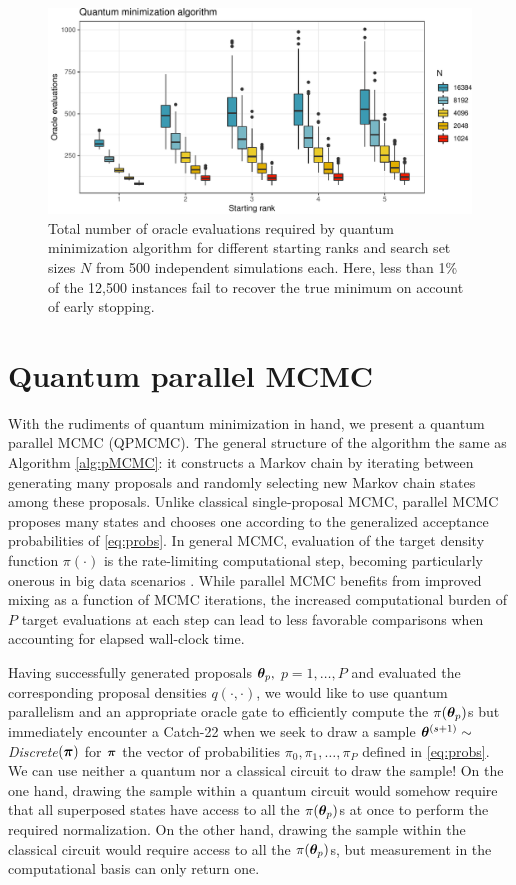 \documentclass[12pt]{article} %
\begin{document}
 \begin{figure}[!t]
	\centering
	\includegraphics[width=0.7\linewidth]{qMinAlg.pdf}
	\caption{Total number of oracle evaluations required by quantum minimization algorithm \citep{durr1996quantum} for different starting ranks and search set sizes $N$ from 500 independent simulations each.  Here, less than 1\% of the 12,500 instances fail to recover the true minimum on account of early stopping.}\label{fig:qMinAlg}
\end{figure}

\section{Quantum parallel MCMC}\label{sec:qpmcmc}

With the rudiments of quantum minimization in hand, we present a quantum parallel MCMC (QPMCMC). The general structure of the algorithm the same as Algorithm \ref{alg:pMCMC}: it constructs a Markov chain by iterating between generating many proposals and randomly selecting new Markov chain states among these proposals.  Unlike classical single-proposal MCMC, parallel MCMC proposes many states and chooses one according to the generalized acceptance probabilities of \eqref{eq:probs}.
 In general MCMC, evaluation of the target density function $\pi(\cdot)$ is the rate-limiting computational step, becoming particularly onerous in big data scenarios \citep{massive}.  While parallel MCMC benefits from improved mixing as a function of MCMC iterations, the increased computational burden of $P$ target evaluations at each step can lead to less favorable comparisons when accounting for elapsed wall-clock time.
 
Having successfully generated proposals $\boldsymbol{\theta}_p,$ $p=1,\dots,P$ and evaluated the corresponding proposal densities $q(\cdot,\cdot)$, we would like to use quantum parallelism and an appropriate oracle gate to efficiently compute the $\pi(\boldsymbol{\theta}_p)$s but immediately encounter a Catch-22 when we seek to draw a sample $\boldsymbol{\theta}^{(s+1)} \sim$ \emph{Discrete}$(\boldsymbol{\pi})$ for $\boldsymbol{\pi}$ the vector of probabilities $\pi_0,\pi_1,\dots,\pi_P$ defined in \eqref{eq:probs}.  We can use neither a quantum nor a classical circuit to draw the sample! On the one hand, drawing the sample within a quantum circuit would somehow require that all superposed states have access to all the $\pi(\boldsymbol{\theta}_p)$s at once to perform the required normalization.  On the other hand, drawing the sample within the classical circuit would require access to all the $\pi(\boldsymbol{\theta}_p)$s, but measurement in the computational basis can only return one. 
 
\end{document}
